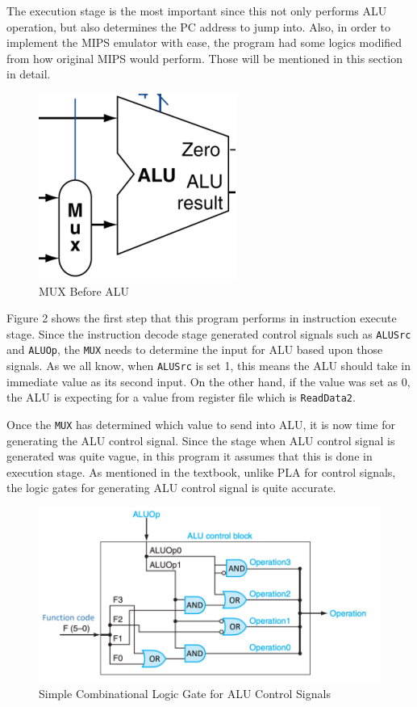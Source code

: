 \documentclass{homework}
\begin{document}
The execution stage is the most important since this not only performs ALU operation, but also determines the PC address to jump into. Also, in order to implement the MIPS emulator with ease, the program had some logics modified from how original MIPS would perform. Those will be mentioned in this section in detail.

\begin{figure}[h]
\begin{center}
\includegraphics[scale=0.5]{alu_mux.png}    
\caption{MUX Before ALU}
\end{center}
\end{figure}

Figure 2 shows the first step that this program performs in instruction execute stage. Since the instruction decode stage generated control signals such as \texttt{ALUSrc} and \texttt{ALUOp}, the \texttt{MUX} needs to determine the input for ALU based upon those signals. As we all know, when \texttt{ALUSrc} is set 1, this means the ALU should take in immediate value as its second input. On the other hand, if the value was set as 0, the ALU is expecting for a value from register file which is \texttt{ReadData2}. 

Once the \texttt{MUX} has determined which value to send into ALU, it is now time for generating the ALU control signal. Since the stage when ALU control signal is generated was quite vague, in this program it assumes that this is done in execution stage. As mentioned in the textbook, unlike PLA for control signals, the logic gates for generating ALU control signal is quite accurate. 

\begin{figure}[h]
\begin{center}
\includegraphics[scale=0.45]{alu_control_signal.png}    
\caption{Simple Combinational Logic Gate for ALU Control Signals}
\end{center}
\end{figure}
\end{document}
